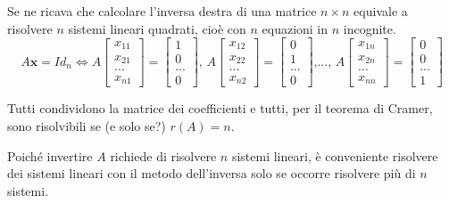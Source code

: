 \documentclass{article}
\begin{document}
Se ne ricava che calcolare l'inversa destra di una matrice $n\times n$
equivale a risolvere $n$ sistemi lineari quadrati, cio\`{e} con $n$
equazioni in $n$ incognite.%
\begin{equation*}
A\mathbf{x}=Id_{n}\Longleftrightarrow A\left[ 
\begin{array}{c}
x_{11} \\ 
x_{21} \\ 
... \\ 
x_{n1}%
\end{array}%
\right] =\left[ 
\begin{array}{c}
1 \\ 
0 \\ 
... \\ 
0%
\end{array}%
\right] \text{, }A\left[ 
\begin{array}{c}
x_{12} \\ 
x_{22} \\ 
... \\ 
x_{n2}%
\end{array}%
\right] =\left[ 
\begin{array}{c}
0 \\ 
1 \\ 
... \\ 
0%
\end{array}%
\right] \text{,..., }A\left[ 
\begin{array}{c}
x_{1n} \\ 
x_{2n} \\ 
... \\ 
x_{nn}%
\end{array}%
\right] =\left[ 
\begin{array}{c}
0 \\ 
0 \\ 
... \\ 
1%
\end{array}%
\right]
\end{equation*}

Tutti condividono la matrice dei coefficienti e tutti, per il teorema di
Cramer, sono risolvibili se (e solo se?) $r\left( A\right) =n$.

Poich\'{e} invertire $A$ richiede di risolvere $n$ sistemi lineari, \`{e}
conveniente risolvere dei sistemi lineari con il metodo dell'inversa solo se
occorre risolvere pi\`{u} di $n$ sistemi.
\end{document}
